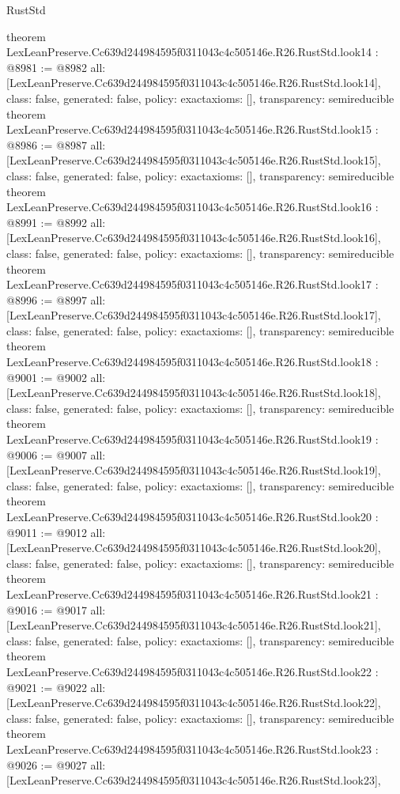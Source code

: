 \begin{lexlean}{RustStd}
\begin{coremodule}
{}
theorem LexLeanPreserve.Cc639d244984595f0311043c4c505146e.R26.RustStd.look14 : @8981 := @8982 {
  all: [LexLeanPreserve.Cc639d244984595f0311043c4c505146e.R26.RustStd.look14],
  class: false,
  generated: false,
  policy: exact{axioms: []},
  transparency: semireducible
}
theorem LexLeanPreserve.Cc639d244984595f0311043c4c505146e.R26.RustStd.look15 : @8986 := @8987 {
  all: [LexLeanPreserve.Cc639d244984595f0311043c4c505146e.R26.RustStd.look15],
  class: false,
  generated: false,
  policy: exact{axioms: []},
  transparency: semireducible
}
theorem LexLeanPreserve.Cc639d244984595f0311043c4c505146e.R26.RustStd.look16 : @8991 := @8992 {
  all: [LexLeanPreserve.Cc639d244984595f0311043c4c505146e.R26.RustStd.look16],
  class: false,
  generated: false,
  policy: exact{axioms: []},
  transparency: semireducible
}
theorem LexLeanPreserve.Cc639d244984595f0311043c4c505146e.R26.RustStd.look17 : @8996 := @8997 {
  all: [LexLeanPreserve.Cc639d244984595f0311043c4c505146e.R26.RustStd.look17],
  class: false,
  generated: false,
  policy: exact{axioms: []},
  transparency: semireducible
}
theorem LexLeanPreserve.Cc639d244984595f0311043c4c505146e.R26.RustStd.look18 : @9001 := @9002 {
  all: [LexLeanPreserve.Cc639d244984595f0311043c4c505146e.R26.RustStd.look18],
  class: false,
  generated: false,
  policy: exact{axioms: []},
  transparency: semireducible
}
theorem LexLeanPreserve.Cc639d244984595f0311043c4c505146e.R26.RustStd.look19 : @9006 := @9007 {
  all: [LexLeanPreserve.Cc639d244984595f0311043c4c505146e.R26.RustStd.look19],
  class: false,
  generated: false,
  policy: exact{axioms: []},
  transparency: semireducible
}
theorem LexLeanPreserve.Cc639d244984595f0311043c4c505146e.R26.RustStd.look20 : @9011 := @9012 {
  all: [LexLeanPreserve.Cc639d244984595f0311043c4c505146e.R26.RustStd.look20],
  class: false,
  generated: false,
  policy: exact{axioms: []},
  transparency: semireducible
}
theorem LexLeanPreserve.Cc639d244984595f0311043c4c505146e.R26.RustStd.look21 : @9016 := @9017 {
  all: [LexLeanPreserve.Cc639d244984595f0311043c4c505146e.R26.RustStd.look21],
  class: false,
  generated: false,
  policy: exact{axioms: []},
  transparency: semireducible
}
theorem LexLeanPreserve.Cc639d244984595f0311043c4c505146e.R26.RustStd.look22 : @9021 := @9022 {
  all: [LexLeanPreserve.Cc639d244984595f0311043c4c505146e.R26.RustStd.look22],
  class: false,
  generated: false,
  policy: exact{axioms: []},
  transparency: semireducible
}
theorem LexLeanPreserve.Cc639d244984595f0311043c4c505146e.R26.RustStd.look23 : @9026 := @9027 {
  all: [LexLeanPreserve.Cc639d244984595f0311043c4c505146e.R26.RustStd.look23],
}
\end{coremodule}
\end{lexlean}
